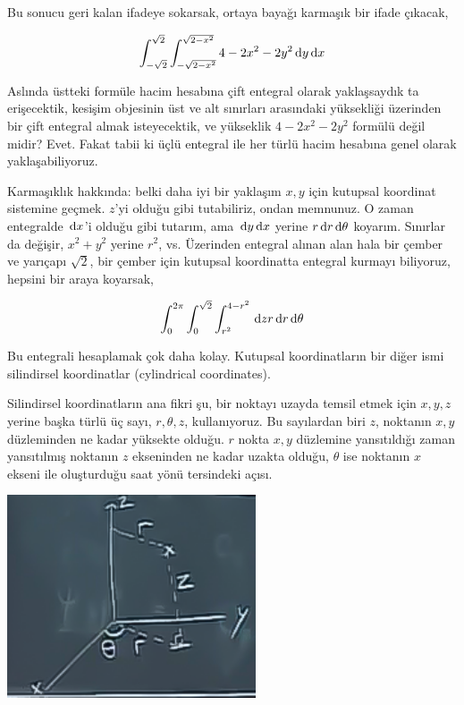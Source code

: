 \documentclass[12pt,fleqn]{article}\usepackage{../../common}
\begin{document}
Bu sonucu geri kalan ifadeye sokarsak, ortaya bayağı karmaşık bir ifade
çıkacak, 

$$ 
\int _{-\sqrt{2}}^{\sqrt{2}} \int _{-\sqrt{2-x^2}}^{\sqrt{2-x^2}} 
4-2x^2-2y^2 \,\mathrm{d} y \,\mathrm{d} x
$$

Aslında üstteki formüle hacim hesabına çift entegral olarak yaklaşsaydık ta
erişecektik, kesişim objesinin üst ve alt sınırları arasındaki yüksekliği
üzerinden bir çift entegral almak isteyecektik, ve yükseklik $4-2x^2-2y^2$
formülü değil midir? Evet. Fakat tabii ki üçlü entegral ile her türlü hacim
hesabına genel olarak yaklaşabiliyoruz.

Karmaşıklık hakkında: belki daha iyi bir yaklaşım $x,y$ için kutupsal
koordinat sistemine geçmek. $z$'yi olduğu gibi tutabiliriz, ondan
memnunuz. O zaman entegralde $\,\mathrm{d} x$'i olduğu gibi tutarım, ama
$\,\mathrm{d} y \,\mathrm{d} x$ yerine $r \,\mathrm{d} r \,\mathrm{d}\theta$ koyarım. Sınırlar da değişir,
$x^2+y^2$ yerine $r^2$, vs. Üzerinden entegral alınan alan hala bir çember
ve yarıçapı $\sqrt{2}$, bir çember için kutupsal koordinatta entegral
kurmayı biliyoruz, hepsini bir araya koyarsak,

$$ 
\int _{0}^{2\pi} \int _{0}^{\sqrt{2}} \int_{r^2}^{4-r^2} 
\,\mathrm{d} z r \,\mathrm{d} r \,\mathrm{d}\theta
$$

Bu entegrali hesaplamak çok daha kolay. Kutupsal koordinatların bir diğer
ismi silindirsel koordinatlar (cylindrical coordinates). 

Silindirsel koordinatların ana fikri şu, bir noktayı uzayda temsil etmek
için $x,y,z$ yerine başka türlü üç sayı, $r,\theta,z$, kullanıyoruz. Bu
sayılardan biri $z$, noktanın $x,y$ düzleminden ne kadar yüksekte
olduğu. $r$ nokta $x,y$ düzlemine yansıtıldığı zaman yansıtılmış noktanın
$z$ ekseninden ne kadar uzakta olduğu, $\theta$ ise noktanın $x$ ekseni ile
oluşturduğu saat yönü tersindeki açısı. 

\begin{center}
\includegraphics[height=6cm]{25_8.png}
\end{center}
\end{document}
